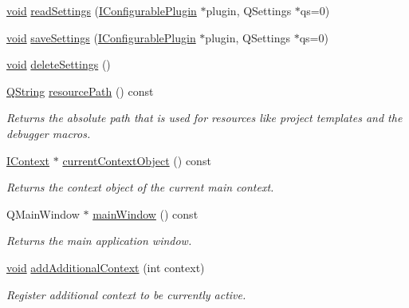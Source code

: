 \begin{DoxyCompactItemize}
\item 
\hyperlink{group___u_a_v_objects_plugin_ga444cf2ff3f0ecbe028adce838d373f5c}{void} \hyperlink{group___core_plugin_ga9001320c2014e97ce6eb7d671e848b7e}{read\-Settings} (\hyperlink{class_core_1_1_i_configurable_plugin}{\-I\-Configurable\-Plugin} $\ast$plugin, \-Q\-Settings $\ast$qs=0)
\item 
\hyperlink{group___u_a_v_objects_plugin_ga444cf2ff3f0ecbe028adce838d373f5c}{void} \hyperlink{group___core_plugin_gacf3a05b02646c405db2d558e6be9dcc7}{save\-Settings} (\hyperlink{class_core_1_1_i_configurable_plugin}{\-I\-Configurable\-Plugin} $\ast$plugin, \-Q\-Settings $\ast$qs=0)
\item 
\hyperlink{group___u_a_v_objects_plugin_ga444cf2ff3f0ecbe028adce838d373f5c}{void} \hyperlink{group___core_plugin_ga5b7459370fa3bbf7ce640daeb6fc24bf}{delete\-Settings} ()
\item 
\hyperlink{group___u_a_v_objects_plugin_gab9d252f49c333c94a72f97ce3105a32d}{\-Q\-String} \hyperlink{group___core_plugin_gaec002f1acc867600ed77ab14b6deb37d}{resource\-Path} () const 
\begin{DoxyCompactList}\small\item\em \-Returns the absolute path that is used for resources like project templates and the debugger macros. \end{DoxyCompactList}\item 
\hyperlink{class_core_1_1_i_context}{\-I\-Context} $\ast$ \hyperlink{group___core_plugin_ga8216933cd5d2cfa42d5769b653dbeac6}{current\-Context\-Object} () const 
\begin{DoxyCompactList}\small\item\em \-Returns the context object of the current main context. \end{DoxyCompactList}\item 
\-Q\-Main\-Window $\ast$ \hyperlink{group___core_plugin_gad583b7ea7f5c09f09ec4a779616c05d9}{main\-Window} () const 
\begin{DoxyCompactList}\small\item\em \-Returns the main application window. \end{DoxyCompactList}\item 
\hyperlink{group___u_a_v_objects_plugin_ga444cf2ff3f0ecbe028adce838d373f5c}{void} \hyperlink{group___core_plugin_ga94cc910efec0c3aa04bd218699c7fbac}{add\-Additional\-Context} (int context)
\begin{DoxyCompactList}\small\item\em \-Register additional context to be currently active. \end{DoxyCompactList}\item 

\end{DoxyCompactItemize}
